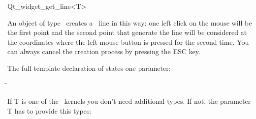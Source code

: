 
\begin{ccRefClass}{Qt_widget_get_line<T>}

\ccDefinition
An object of type \ccRefName\ creates a \cgal\ line in this way: one 
left click on the mouse will be the first point and the second point 
that generate the line will be considered at the coordinates where the left
mouse button is pressed for the second time.
You can always cancel the creation process by pressing the ESC key.


\ccParameters

The full template declaration of  states one parameter:

\begin{tabbing}
 \=\\
\end{tabbing}

If T is one of the \cgal\ kernels you don't need additional types. If
not, the parameter T has to provide this types:

\ccTypes
{}

\ccInheritsFrom
{}

\ccGlue

\ccCreation
{}


\end{ccRefClass}









